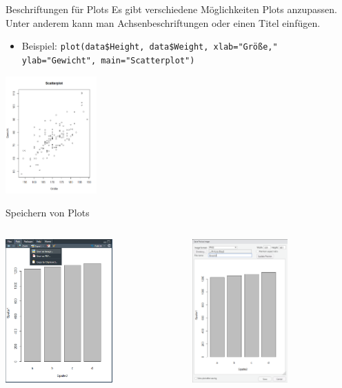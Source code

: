 \documentclass[aspectratio = 169]{chariteBeamer}
\begin{document}
\begin{frame}[fragile]{Beschriftungen für Plots}
	Es gibt verschiedene Möglichkeiten Plots anzupassen. Unter anderem kann man Achsenbeschriftungen oder einen Titel einfügen.
	\begin{itemize}
		\item Beispiel: \verb+plot(data$Height, data$Weight, xlab="Größe,"+
		\verb+            ylab="Gewicht", main="Scatterplot")+
	\end{itemize}
			
	\begin{center}
		\includegraphics[height=4.5cm]{AnnotatedPlot}
	\end{center}
\end{frame}

\begin{frame}[fragile]{Speichern von Plots}
	\begin{columns}[T]
		\begin{column}{0.5\textwidth}
			\begin{center}
				\includegraphics[height=5.5cm]{SaveImage}
			\end{center}
		\end{column}
		\begin{column}{0.5\textwidth}
			\begin{center}
				\includegraphics[height=5.5cm]{SaveImage2}
			\end{center}
		\end{column}
	\end{columns}	
\end{frame}
\end{document}
